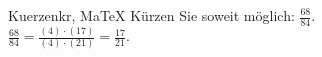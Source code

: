 \begin{MAufgabe}{Kuerzen}{kr, MaTeX}
K\"urzen Sie soweit m\"oglich: $\frac{68}{84}$.\\ 
\ifLsg\MLoesung
\quad $\frac{68}{84}=\frac{(4)\cdot(17)}{(4)\cdot(21)}=\frac{17}{21}$.\else\relax\fi
 \end{MAufgabe}